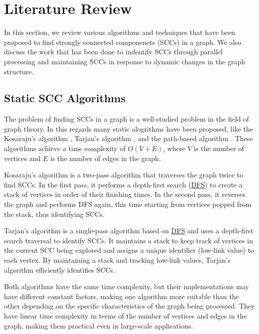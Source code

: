\section{Literature Review} \label{Sec: Literature Review}

In this section, we review various algorithms and techniques that have been proposed to find strongly connected componenets (SCCs) in a graph.
We also discuss the work that has been done to indentify SCCs through parallel processing and maintaining SCCs in response to dynamic changes in the graph structure.

\subsection{Static SCC Algorithms} \label{SubSec: Static SCC Algorithms}

The problem of finding SCCs in a graph is a well-studied problem in the field of graph theory.
In this regards many static alogrithms have been proposed, like the Kosaraju's algorithm \cite{find_scc_algorithm}, Tarjan's algorithm \cite{DBLP:journals/corr/abs-2201-07197}, and the path-based algorithm \cite{Cheriyan1996AlgorithmsFD}.
These algorithms achieve a time complexity of $O(V+E)$, where $V$ is the number of vertices and $E$ is the number of edges in the graph. 

Kosaraju's algorithm is a two-pass algorithm that traverses the graph twice to find SCCs. In the first pass, it performs a depth-first search (\hyperref[dfs]{DFS}) to create a stack of vertices in order of their finishing times. In the second pass, it reverses the graph and performs DFS again, this time starting from vertices popped from the stack, thus identifying SCCs.

Tarjan's algorithm is a single-pass algorithm based on \hyperref[dfs]{DFS} and uses a depth-first search traversal to identify SCCs. It maintains a stack to keep track of vertices in the current SCC being explored and assigns a unique identifier (low-link value) to each vertex. By maintaining a stack and tracking low-link values, Tarjan's algorithm efficiently identifies SCCs.

Both algorithms have the same time complexity, but their implementations may have different constant factors, making one algorithm more suitable than the other depending on the specific characteristics of the graph being processed. They have linear time complexity in terms of the number of vertices and edges in the graph, making them practical even in large-scale applications.

